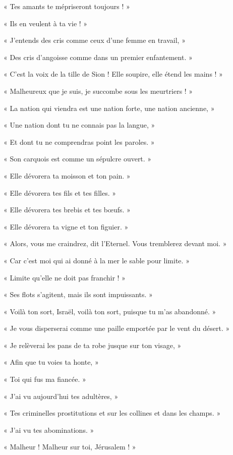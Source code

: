 \documentclass[a4paper, 11pt, oneside, polutonikogreek, french]{article}
\begin{document}
« Tes amants te mépriseront toujours ! »

« Ils en veulent à ta vie ! »

« J'entends des cris comme ceux d'une femme en travail, »

« Des cris d'angoisse comme dans un premier enfantement. »

« C'est la voix de la tille de Sion ! Elle soupire, elle étend les mains ! »

« Malheureux que je suis, je succombe sous les meurtriers ! »

« La nation qui viendra est une nation forte, une nation ancienne, »

« Une nation dont tu ne connais pas la langue, »

« Et dont tu ne comprendras point les paroles. »

« Son carquois est comme un sépulcre ouvert. »

« Elle dévorera ta moisson et ton pain. »

« Elle dévorera tes fils et tes filles. »

« Elle dévorera tes brebis et tes bœufs. »

« Elle dévorera ta vigne et ton figuier. »

« Alors, vous me craindrez, dit l'Eternel. Vous tremblerez devant moi. »

« Car c'est moi qui ai donné à la mer le sable pour limite. »

« Limite qu'elle ne doit pas franchir ! »

« Ses flots s'agitent, mais ils sont impuissants. »

« Voilà ton sort, Israël, voilà ton sort, puisque tu m'as abandonné. »

« Je vous disperserai comme une paille emportée par le vent du désert. »

« Je relèverai les pans de ta robe jusque sur ton visage, »

« Afin que tu voies ta honte, »

« Toi qui fus ma fiancée. »

« J'ai vu aujourd'hui tes adultères, »

« Tes criminelles prostitutions et sur les collines et dans les champs. »

« J'ai vu tes abominations. »

« Malheur ! Malheur sur toi, Jérusalem ! »

\bigskip
\centerline{\EightStarTaper}
\centerline{\EightStarTaper\EightStarTaper}
\bigskip
\end{document}
